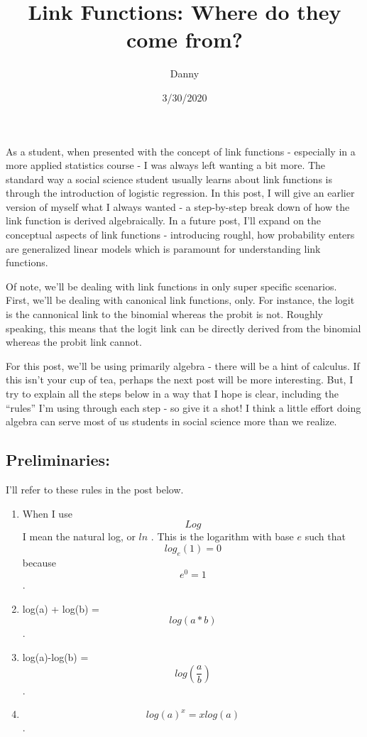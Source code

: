 \documentclass[
]{article}
\title{Link Functions: Where do they come from?}
\author{Danny}
\date{3/30/2020}
\providecommand{\tightlist}{%
  \setlength{\itemsep}{0pt}\setlength{\parskip}{0pt}}
\begin{document}
\maketitle

As a student, when presented with the concept of link functions -
especially in a more applied statistics course - I was always left
wanting a bit more. The standard way a social science student usually
learns about link functions is through the introduction of logistic
regression. In this post, I will give an earlier version of myself what
I always wanted - a step-by-step break down of how the link function is
derived algebraically. In a future post, I'll expand on the conceptual
aspects of link functions - introducing roughl, how probability enters
are generalized linear models which is paramount for understanding link
functions.

Of note, we'll be dealing with link functions in only super specific
scenarios. First, we'll be dealing with canonical link functions, only.
For instance, the logit is the cannonical link to the binomial whereas
the probit is not. Roughly speaking, this means that the logit link can
be directly derived from the binomial whereas the probit link cannot.

For this post, we'll be using primarily algebra - there will be a hint
of calculus. If this isn't your cup of tea, perhaps the next post will
be more interesting. But, I try to explain all the steps below in a way
that I hope is clear, including the ``rules'' I'm using through each
step - so give it a shot! I think a little effort doing algebra can
serve most of us students in social science more than we realize.

\hypertarget{preliminaries}{%
\subsection{Preliminaries:}\label{preliminaries}}

I'll refer to these rules in the post below.

\begin{enumerate}
\def\labelenumi{\arabic{enumi}.}
\tightlist
\item
  When I use \[Log\] I mean the natural log, or \(ln\) . This is the
  logarithm with base \(e\) such that \[log_e(1) = 0\] because
  \[e^0 =1\] .
\item
  log(a) + log(b) = \[log(a*b)\] .
\item
  log(a)-log(b) = \[log(\frac{a}{b})\] .
\item
  \[log(a)^x = xlog(a)\] .
\end{enumerate}
\end{document}
